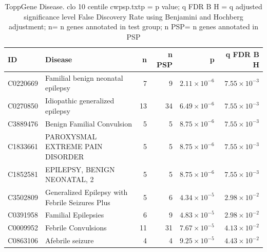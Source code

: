 \begin{table}[ht]
\centering
\begin{tabular}{llrrrr}
  \hline
ID & Disease & n & n PSP & p & q FDR B H \\ 
  \hline
C0220669 & Familial benign neonatal epilepsy & 7 & 9 & $2.11 \times 10^{-6}$ & $7.55 \times 10^{-3}$ \\ 
  C0270850 & Idiopathic generalized epilepsy & 13 & 34 & $6.49 \times 10^{-6}$ & $7.55 \times 10^{-3}$ \\ 
  C3889476 & Benign Familial Convulsion & 5 & 5 & $8.75 \times 10^{-6}$ & $7.55 \times 10^{-3}$ \\ 
  C1833661 & PAROXYSMAL EXTREME PAIN DISORDER & 5 & 5 & $8.75 \times 10^{-6}$ & $7.55 \times 10^{-3}$ \\ 
  C1852581 & EPILEPSY, BENIGN NEONATAL, 2 & 5 & 5 & $8.75 \times 10^{-6}$ & $7.55 \times 10^{-3}$ \\ 
  C3502809 & Generalized Epilepsy with Febrile Seizures Plus & 5 & 6 & $4.34 \times 10^{-5}$ & $2.98 \times 10^{-2}$ \\ 
  C0391958 & Familial Epilepsies & 6 & 9 & $4.83 \times 10^{-5}$ & $2.98 \times 10^{-2}$ \\ 
  C0009952 & Febrile Convulsions & 11 & 31 & $7.67 \times 10^{-5}$ & $4.13 \times 10^{-2}$ \\ 
  C0863106 & Afebrile seizure & 4 & 4 & $9.25 \times 10^{-5}$ & $4.43 \times 10^{-2}$ \\ 
   \hline
\end{tabular}
\caption{ToppGene Disease. clo 10 centile cwpsp.txtp = p value; q FDR B H = q adjusted significance level False Discovery Rate using Benjamini and Hochberg adjustment; n= n genes annotated in test group; n PSP= n genes annotated in PSP} 
\label{tab:ToppGENE Disease. clo 10 centile cwpsp.txtp = p value; q FDR B H = q adjusted significance level False Discovery Rate using Benjamini and Hochberg adjustment; n= n genes annotated in test group; n PSP= n genes annotated in PSP}
\end{table}


